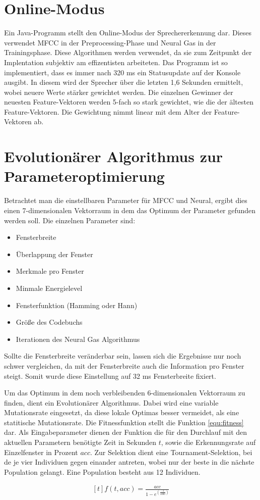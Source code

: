 \section{Online-Modus}
Ein Java-Programm stellt den Online-Modus der Sprechererkennung dar. Dieses verwendet MFCC in der Preprocessing-Phase und Neural Gas in der Trainingsphase. Diese Algorithmen werden verwendet, da sie zum Zeitpunkt der Implentation subjektiv am effizentisten arbeiteten. Das Programm ist so implementiert, dass es immer nach 320 ms ein Statusupdate auf der Konsole ausgibt. In diesem wird der Sprecher über die letzten 1,6 Sekunden ermittelt, wobei neuere Werte stärker gewichtet werden. Die einzelnen Gewinner der neuesten Feature-Vektoren werden 5-fach so stark gewichtet, wie die der ältesten Feature-Vektoren. Die Gewichtung nimmt linear mit dem Alter der Feature-Vektoren ab.

\section{Evolutionärer Algorithmus zur Parameteroptimierung}
Betrachtet man die einstellbaren Parameter für MFCC und Neural, ergibt dies einen 7-dimensionalen Vektorraum in dem das Optimum der Parameter gefunden werden soll. Die einzelnen Parameter sind:
\begin{itemize}
	\item Fensterbreite
	\item Überlappung der Fenster
	\item Merkmale pro Fenster
	\item Minmale Energielevel
	\item Fensterfunktion (Hamming oder Hann)
	\item Größe des Codebuchs
	\item Iterationen des Neural Gas Algorithmus
\end{itemize}
Sollte die Fensterbreite veränderbar sein, lassen sich die Ergebnisse nur noch schwer vergleichen, da mit der Fensterbreite auch die Information pro Fenster steigt. Somit wurde diese Einstellung auf 32 ms Fensterbreite fixiert.

Um das Optimum in dem noch verbleibenden 6-dimensionalen Vektorraum zu finden, dient ein Evolutionärer Algorithmus. Dabei wird eine variable Mutationsrate eingesetzt, da diese lokale Optimas besser vermeidet, als eine statitische Mutationsrate. Die Fitnessfunktion stellt die Funktion \ref{equ:fitness} dar. Als Eingabeparameter dienen der Funktion die für den Durchlauf mit den aktuellen Parametern benötigte Zeit in Sekunden $t$, sowie die Erkennungsrate auf Einzelfenster in Prozent $acc$. Zur Selektion dient eine Tournament-Selektion, bei de je vier Individuen gegen einander antreten, wobei nur der beste in die nächste Population gelangt. Eine Population besteht aus 12 Individuen. 

\begin{equation}
	\label{equ:fitness}
	\begin{aligned}[t]f(t,acc) = \frac{acc}{1 - e^{\left(\frac{-t}{1000}\right)}}\end{aligned}
\end{equation}
